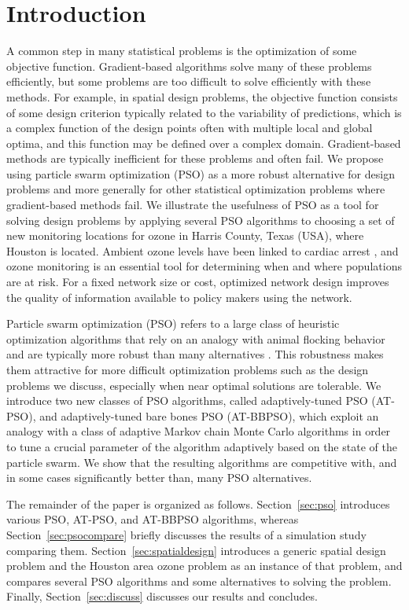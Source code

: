 \documentclass[cmbright]{staauth}
\begin{document}
\section{Introduction}
A common step in many statistical problems is the optimization of some objective function. Gradient-based algorithms solve many of these problems efficiently, but some problems are too difficult to solve efficiently with these methods. For example, in spatial design problems, the objective function consists of some design criterion typically related to the variability of predictions, which is a complex function of the design points often with multiple local and global optima, and this function may be defined over a complex domain. Gradient-based methods are typically inefficient for these problems and often fail. We propose using particle swarm optimization (PSO) as a more robust alternative for design problems and more generally for other statistical optimization problems where gradient-based methods fail. We illustrate the usefulness of PSO as a tool for solving design problems by applying several PSO algorithms to choosing a set of new monitoring locations for ozone in Harris County, Texas (USA), where Houston is located. Ambient ozone levels have been linked to cardiac arrest \citep{ensor2013case}, and ozone monitoring is an essential tool for determining when and where populations are at risk. For a fixed network size or cost, optimized network design improves the quality of information available to policy makers using the network.

Particle swarm optimization (PSO) refers to a large class of heuristic optimization algorithms that rely on an analogy with animal flocking behavior and are typically more robust than many alternatives \citep{clerc2002particle,blum2008swarm,clerc2010particle}. This robustness makes them attractive for more difficult optimization problems such as the design problems we discuss, especially when near optimal solutions are tolerable. We introduce two new classes of PSO algorithms, called adaptively-tuned PSO (AT-PSO), and adaptively-tuned bare bones PSO (AT-BBPSO), which exploit an analogy with a class of adaptive Markov chain Monte Carlo algorithms in order to tune a crucial parameter of the algorithm adaptively based on the state of the particle swarm. We show that the resulting algorithms are competitive with, and in some cases significantly better than, many PSO alternatives.

The remainder of the paper is organized as follows. Section~\ref{sec:pso} introduces various PSO, AT-PSO, and AT-BBPSO algorithms, whereas Section~\ref{sec:psocompare} briefly discusses the results of a simulation study comparing them. Section~\ref{sec:spatialdesign} introduces a generic spatial design problem and the Houston area ozone problem as an instance of that problem, and compares several PSO algorithms and some alternatives to solving the problem. Finally, Section~\ref{sec:discuss} discusses our results and concludes. 
\end{document}
